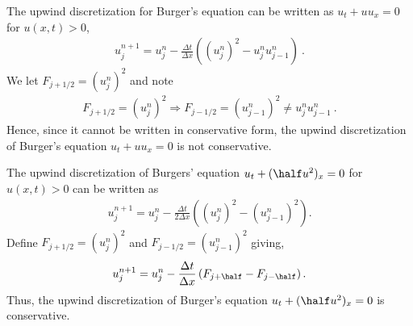
\begin{questions}


\begin{solution}

The upwind discretization for Burger's equation can be written as $u_t + u
u_x = 0$ for $u(x,t) > 0$,
\begin{align*}
u^{n+1}_j = u^n_j - \frac{\Delta t}{\Delta x}\left(\left(u_j^n\right)^2-u_j^nu_{j-1}^n\right)~.
\end{align*}
We let $F_{j+1/2}=\left(u_j^n\right)^2$ and note
\begin{align*}
F_{j+1/2}=\left(u_j^n\right)^2 \Rightarrow F_{j-1/2} = \left(u_{j-1}^n\right)^2 \neq u_j^nu_{j-1}^n~.
\end{align*}
Hence, since it cannot be written in conservative form, the upwind discretization of Burger's equation $u_t + u
u_x = 0$ is not conservative. 

\end{solution}


\begin{solution}

The upwind discretization of Burgers' equation $u_t + (\half u^2)_x = 0$ for $u(x,t) > 0$ can be written as
\begin{align*}
u^{n+1}_j = u^n_j - \frac{\Delta t}{2 \Delta x}
        \left((u^n_j)^2-(u^n_{j-1})^2\right).
\end{align*}
Define $F_{j+1/2}=\left(u_j^n\right)^2$ and $F_{j-1/2}=\left(u_{j-1}^n\right)^2$ giving,
\begin{align*}
u^{n+1}_j = u^n_j - \frac{\Delta t}{\Delta x}
	\left(F_{j+\half} - F_{j-\half}\right).
\end{align*}
Thus, the upwind discretization of Burger's equation $u_t + (\half u^2)_x = 0$ is conservative. 

\end{solution}

\end{questions}
